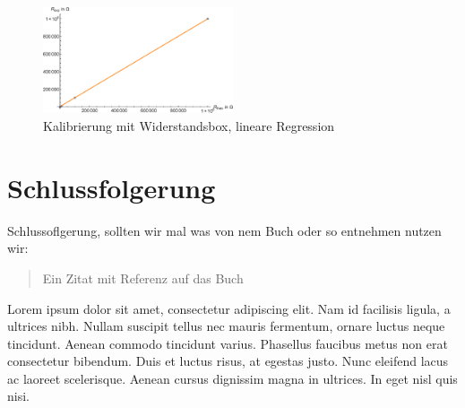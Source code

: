 \documentclass[aps,twocolumn,secnumarabic,nobalancelastpage,amsmath,amssymb,
nofootinbib,superscriptaddress]{revtex4-1}
\begin{document}
\begin{figure}[h]
  \centering
  \includegraphics[width=0.5\textwidth]{Berechnung-Bilder/box.eps}
  \caption{Kalibrierung mit Widerstandsbox, lineare Regression}
  \label{fig:box}
\end{figure}




\section{Schlussfolgerung}

Schlussoflgerung, sollten wir mal was von nem Buch oder so entnehmen nutzen wir:


\begin{quote}
  Ein Zitat mit Referenz auf das Buch\cite{melissinos1966}
\end{quote}

Lorem ipsum dolor sit amet, consectetur adipiscing elit. Nam id facilisis ligula,
a ultrices nibh. Nullam suscipit tellus nec mauris fermentum, ornare luctus neque
tincidunt. Aenean commodo tincidunt varius. Phasellus faucibus metus non erat
consectetur bibendum. Duis et luctus risus, at egestas justo. Nunc eleifend lacus
ac laoreet scelerisque. Aenean cursus dignissim magna in ultrices. In eget nisl
quis nisi.
\end{document}
